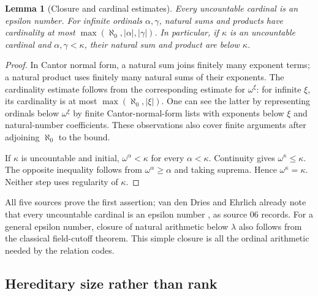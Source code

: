 \documentclass[11pt,letterpaper]{article}
\newtheorem{lemma}[lemma]{Lemma}\aliascntresetthe{lemma}
\theoremstyle{definition}
\theoremstyle{remark}
\newcommand{\card}[1]{\lvert#1\rvert}
\begin{document}
\begin{lemma}[Closure and cardinal estimates]
\label{hset:lem:card-estimates}
Every uncountable cardinal is an epsilon number. For infinite ordinals
$\alpha,\gamma$, natural sums and products have cardinality at most
$\max(\aleph_0,\card\alpha,\card\gamma)$. In particular, if $\kappa$ is an
uncountable cardinal and $\alpha,\gamma<\kappa$, their natural sum and product
are below $\kappa$.
\end{lemma}
\begin{proof}
In Cantor normal form, a natural sum joins finitely many exponent terms; a
natural product uses finitely many natural sums of their exponents. The
cardinality estimate follows from the corresponding estimate for
$\omega^\xi$: for infinite $\xi$, its cardinality is at most
$\max(\aleph_0,\card\xi)$. One can see the latter by representing ordinals
below $\omega^\xi$ by finite Cantor-normal-form lists with exponents below
$\xi$ and natural-number coefficients. These observations also cover
finite arguments after adjoining $\aleph_0$ to the bound.

If $\kappa$ is uncountable and initial, $\omega^\alpha<\kappa$ for every
$\alpha<\kappa$. Continuity gives $\omega^\kappa\le\kappa$. The opposite
inequality follows from $\omega^\alpha\ge\alpha$ and taking suprema. Hence
$\omega^\kappa=\kappa$. Neither step uses regularity of $\kappa$.
\end{proof}

All five sources prove the first assertion; van den Dries and Ehrlich already
note that every uncountable cardinal is an epsilon number \cite{vdDE}, as
source 06 records. For a general epsilon number, closure of natural
arithmetic below $\lambda$ also follows from the classical field-cutoff
theorem. This simple closure is all the ordinal arithmetic needed by the
relation codes.

\subsection{Hereditary size rather than rank}
\end{document}
